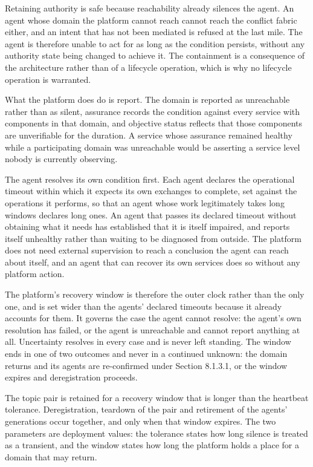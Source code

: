 Retaining authority is safe because reachability already silences the
agent. An agent whose domain the platform cannot reach cannot reach the
conflict fabric either, and an intent that has not been mediated is
refused at the last mile. The agent is therefore unable to act for as
long as the condition persists, without any authority state being
changed to achieve it. The containment is a consequence of the
architecture rather than of a lifecycle operation, which is why no
lifecycle operation is warranted.

What the platform does do is report. The domain is reported as
unreachable rather than as silent, assurance records the condition
against every service with components in that domain, and objective
status reflects that those components are unverifiable for the duration.
A service whose assurance remained healthy while a participating domain
was unreachable would be asserting a service level nobody is currently
observing.

The agent resolves its own condition first. Each agent declares the
operational timeout within which it expects its own exchanges to
complete, set against the operations it performs, so that an agent whose
work legitimately takes long windows declares long ones. An agent that
passes its declared timeout without obtaining what it needs has
established that it is itself impaired, and reports itself unhealthy
rather than waiting to be diagnosed from outside. The platform does not
need external supervision to reach a conclusion the agent can reach
about itself, and an agent that can recover its own services does so
without any platform action.

The platform's recovery window is therefore the outer clock rather than
the only one, and is set wider than the agents' declared timeouts
because it already accounts for them. It governs the case the agent
cannot resolve: the agent's own resolution has failed, or the agent is
unreachable and cannot report anything at all. Uncertainty resolves in
every case and is never left standing. The window ends in one of two
outcomes and never in a continued unknown: the domain returns and its
agents are re-confirmed under Section 8.1.3.1, or the window expires and
deregistration proceeds.

The topic pair is retained for a recovery window that is longer than the
heartbeat tolerance. Deregistration, teardown of the pair and retirement
of the agents' generations occur together, and only when that window
expires. The two parameters are deployment values: the tolerance states
how long silence is treated as a transient, and the window states how
long the platform holds a place for a domain that may return.


